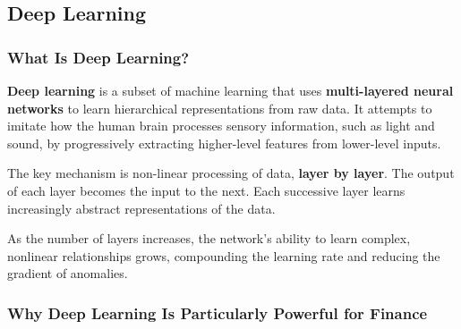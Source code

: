 \documentclass[12pt,openany]{book}
\begin{document}
\subsection{Deep Learning}

\subsubsection{What Is Deep Learning?}

\textbf{Deep learning} is a subset of machine learning that uses \textbf{multi-layered neural networks} to learn hierarchical representations from raw data. It attempts to imitate how the human brain processes sensory information, such as light and sound, by progressively extracting higher-level features from lower-level inputs.

The key mechanism is non-linear processing of data, \textbf{layer by layer}. The output of each layer becomes the input to the next. Each successive layer learns increasingly abstract representations of the data.

\begin{center}
\end{center}

As the number of layers increases, the network's ability to learn complex, nonlinear relationships grows, compounding the learning rate and reducing the gradient of anomalies.

\subsubsection{Why Deep Learning Is Particularly Powerful for Finance}
\end{document}
